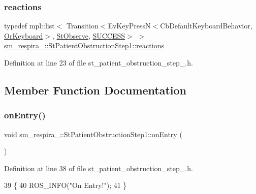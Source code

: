 \subsubsection{\texorpdfstring{reactions}{reactions}}
{\footnotesize\ttfamily typedef mpl\+::list$<$ Transition$<$Ev\+Key\+PressN$<$Cb\+Default\+Keyboard\+Behavior, \hyperlink{classsm__respira__1_1_1OrKeyboard}{Or\+Keyboard}$>$, \hyperlink{structsm__respira__1_1_1StObserve}{St\+Observe}, \hyperlink{classSUCCESS}{S\+U\+C\+C\+E\+SS}$>$ $>$ \hyperlink{structsm__respira__1_1_1StPatientObstructionStep1_a3dbf13d6ef34e327ff7fd96006be763e}{sm\+\_\+respira\+\_\+::\+St\+Patient\+Obstruction\+Step1\+::reactions}}



Definition at line 23 of file st\+\_\+patient\+\_\+obstruction\+\_\+step\+\_.\+h.



\subsection{Member Function Documentation}
\mbox{\label{structsm__respira__1_1_1StPatientObstructionStep1_abf880550f32fc9a0013f72862b08b585}} 
\subsubsection{\texorpdfstring{on\+Entry()}{onEntry()}}
{\footnotesize\ttfamily void sm\+\_\+respira\+\_\+::\+St\+Patient\+Obstruction\+Step1\+::on\+Entry (\begin{DoxyParamCaption}{ }\end{DoxyParamCaption})\hspace{0.3cm}{\ttfamily [inline]}}



Definition at line 38 of file st\+\_\+patient\+\_\+obstruction\+\_\+step\+\_.\+h.


\begin{DoxyCode}
39     \{
40         ROS\_INFO(\textcolor{stringliteral}{"On Entry!"});
41     \}
\end{DoxyCode}
\mbox{\label{structsm__respira__1_1_1StPatientObstructionStep1_a9db651db42809f269204c64762f3bad8}} 
